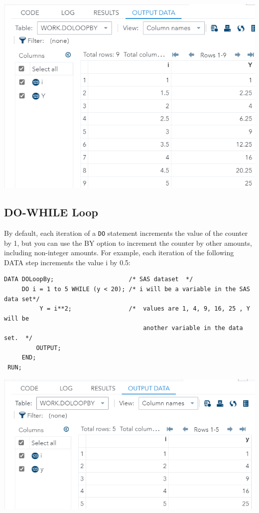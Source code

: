 \documentclass[
]{book}
\begin{document}
\begin{center}\includegraphics[width=1\linewidth]{img10/w10-DOloopBY} \end{center}

\hypertarget{do-while-loop}{%
\subsection{DO-WHILE Loop}\label{do-while-loop}}

By default, each iteration of a \texttt{DO} statement increments the value of the counter by 1, but you can use the BY option to increment the counter by other amounts, including non-integer amounts. For example, each iteration of the following DATA step increments the value i by 0.5:

\begin{verbatim}
DATA DOLoopBy;                     /* SAS dataset  */
     DO i = 1 to 5 WHILE (y < 20); /* i will be a variable in the SAS data set*/
          Y = i**2;                /*  values are 1, 4, 9, 16, 25 , Y will be
                                       another variable in the data set.  */ 
         OUTPUT; 
     END;
 RUN;
\end{verbatim}

\begin{center}\includegraphics[width=1\linewidth]{img10/w10-DO-WHILE} \end{center}
\end{document}
